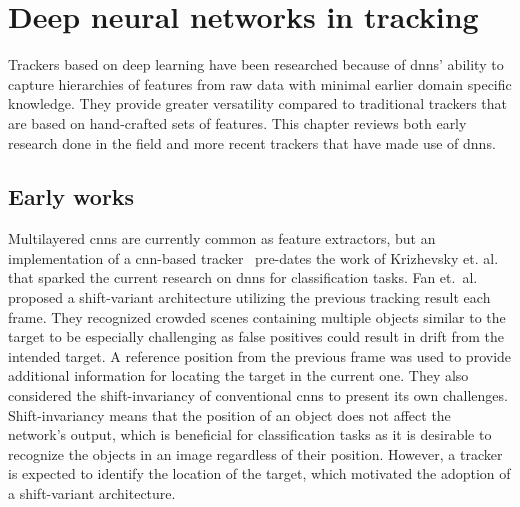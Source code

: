 \section{Deep neural networks in tracking}
Trackers based on deep learning have been researched because of \ac{dnn}s' ability
to capture hierarchies of features from raw data with minimal earlier domain specific
knowledge. They provide greater versatility compared to traditional trackers that are
based on hand-crafted sets of features. This chapter reviews both early research
done in the field and more recent trackers that have made use of \ac{dnn}s.

\subsection{Early works}
Multilayered \ac{cnn}s are currently common as feature extractors, but an implementation
of a \ac{cnn}-based tracker~\cite{HUMAN_CNN} pre-dates the work of Krizhevsky et.
al.~\cite{NIPS_IMAGENET} that sparked the current research on \ac{dnn}s for classification
tasks. Fan et.~al.~\cite{HUMAN_CNN} proposed a shift-variant architecture utilizing the
previous tracking result each frame. They recognized crowded scenes containing multiple
objects similar to the target to be especially challenging as false positives could result
in drift from the intended target. A reference position from the previous frame was used
to provide additional information for locating the target in the current one. They also
considered the shift-invariancy of conventional \ac{cnn}s to present its own challenges.
Shift-invariancy means that the position of an object does not affect the network's output,
which is beneficial for classification tasks as it is desirable to recognize the objects
in an image regardless of their position. However, a tracker is expected to identify the
location of the target, which motivated the adoption of a shift-variant architecture.~\cite{HUMAN_CNN}


